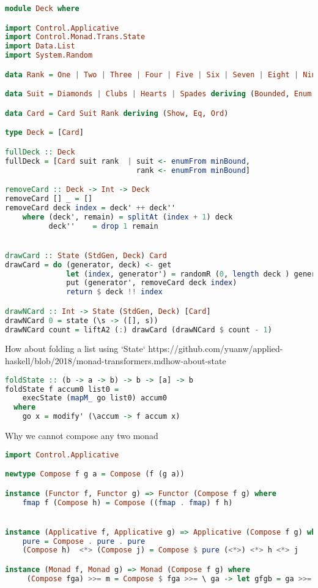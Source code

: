 \begin{lstlisting}[language=haskell]
module Deck where

import Control.Applicative
import Control.Monad.Trans.State
import Data.List
import System.Random

data Rank = One | Two | Three | Four | Five | Six | Seven | Eight | Nine | Ten | Jack | Queue | King deriving (Bounded, Enum, Show, Eq, Ord)

data Suit = Diamonds | Clubs | Hearts | Spades deriving (Bounded, Enum, Show, Eq, Ord)

data Card = Card Suit Rank deriving (Show, Eq, Ord)

type Deck = [Card]

fullDeck :: Deck
fullDeck = [Card suit rank  | suit <- enumFrom minBound,
                              rank <- enumFrom minBound]

removeCard :: Deck -> Int -> Deck
removeCard [] _ = []
removeCard deck index = deck' ++ deck''
    where (deck', remain) = splitAt (index + 1) deck
          deck''    = drop 1 remain


drawCard :: State (StdGen, Deck) Card
drawCard = do (generator, deck) <- get
              let (index, generator') = randomR (0, length deck ) generator
              put (generator', removeCard deck index)
              return $ deck !! index

drawNCard :: Int -> State (StdGen, Deck) [Card]
drawNCard 0 = state (\s -> ([], s))
drawNCard count = liftA2 (:) drawCard (drawNCard $ count - 1)
\end{lstlisting}

How about folding a list using `State`
https://github.com/yuanw/applied-haskell/blob/2018/monad-transformers.mdhow-about-state


\begin{lstlisting}[language=haskell]
foldState :: (b -> a -> b) -> b -> [a] -> b
foldState f accum0 list0 =
    execState (mapM_ go list0) accum0
  where
    go x = modify' (\accum -> f accum x)
\end{lstlisting}


Why we cannot compose any two monad


\begin{lstlisting}[language=haskell]
import Control.Applicative

newtype Compose f g a = Compose (f (g a))

instance (Functor f, Functor g) => Functor (Compose f g) where
    fmap f (Compose h) = Compose ((fmap . fmap) f h)


instance (Applicative f, Applicative g) => Applicative (Compose f g) where
    pure = Compose . pure . pure
    (Compose h)  <*> (Compose j) = Compose $ pure (<*>) <*> h <*> j

instance (Monad f, Monad g) => Monad (Compose f g) where
     (Compose fga) >>= m = Compose $ fga >>= \ ga -> let gfgb = ga >>= (return . m) in undefined
    \end{lstlisting}

